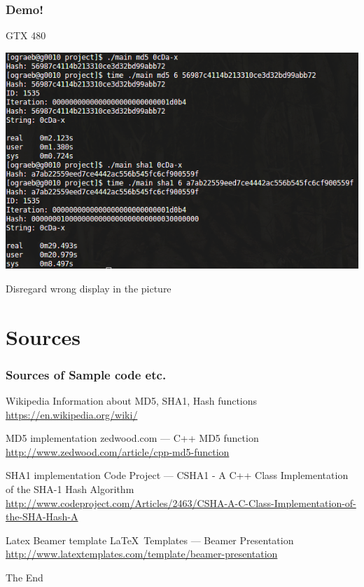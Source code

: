\documentclass{beamer}
\begin{document}
\begin{frame}
	\frametitle{Demo!}
	\begin{center}
		GTX 480

		\includegraphics[width=.7\textwidth]{demo_1.png}
	\end{center}
	{\footnotesize Disregard wrong display in the picture}
\end{frame}

\section{Sources}

\begin{frame}
	\frametitle{Sources of Sample code etc.}
	\footnotesize{
	\begin{thebibliography}{99}
		 Wikipedia
			\newblock{} Information about MD5, SHA1, Hash functions
			\newblock{} \url{https://en.wikipedia.org/wiki/}

		 MD5 implementation
			\newblock{} zedwood.com --- C++ MD5 function
			\newblock{} \url{http://www.zedwood.com/article/cpp-md5-function}

		 SHA1 implementation
			\newblock{} Code Project --- CSHA1 - A C++ Class Implementation of the SHA-1 Hash Algorithm
			\newblock\url{http://www.codeproject.com/Articles/2463/CSHA-A-C-Class-Implementation-of-the-SHA-Hash-A}

		 Latex Beamer template
			\newblock{} \LaTeX\ Templates --- Beamer Presentation
			\newblock{} \url{http://www.latextemplates.com/template/beamer-presentation}
	\end{thebibliography}
	}
\end{frame}


\begin{frame}
\Huge{\centerline{The End}}
\end{frame}

\end{document}

